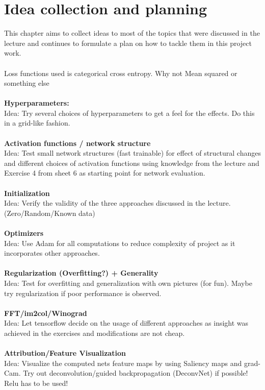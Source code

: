 \documentclass[]{article}
\begin{document}
\section{Idea collection and planning}
\label{ideas}
This chapter aims to collect ideas to most of the topics that were discussed in the lecture and continues to formulate a plan on how to tackle them in this project work.\\
\\
Loss functions used is categorical cross entropy. Why not Mean squared or something else\\
\\
\textbf{Hyperparameters:}\\
Idea: Try several choices of hyperparameters to get a feel for the effects. Do this in a grid-like fashion.\\
\\
\textbf{Activation functions / network structure}\\
Idea: Test small network structures (fast trainable) for effect of structural changes and different choices of activation functions using knowledge from the lecture and Exercise 4 from sheet 6 as starting point for network evaluation.\\
\\
\textbf{Initialization}\\
Idea: Verify the validity of the three approaches discussed in the lecture. (Zero/Random/Known data)\\
\\
\textbf{Optimizers}\\
Idea: Use Adam for all computations to reduce complexity of project as it incorporates other approaches.\\
\\
\textbf{Regularization (Overfitting?) + Generality}\\
Idea: Test for overfitting and generalization with own pictures (for fun). Maybe try regularization if poor performance is observed.\\
\\
\textbf{FFT/im2col/Winograd}\\
Idea: Let tensorflow decide on the usage of different approaches as insight was achieved in the exercises and modifications are not cheap.\\
\\
\textbf{Attribution/Feature Visualization}\\
Idea: Visualize the computed nets feature maps by using Saliency maps and grad-Cam. Try out deconvolution/guided backpropagation (DeconvNet) if possible! Relu has to be used!\\
\\
\end{document}
